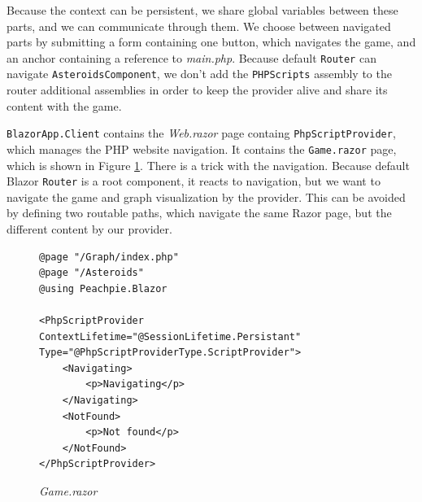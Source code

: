 Because the context can be persistent, we share global variables between these parts, and we can communicate through them.
We choose between navigated parts by submitting a form containing one button, which navigates the game, and an anchor containing a reference to \textit{main.php}.
Because default \texttt{Router} can navigate \texttt{AsteroidsComponent}, we don't add the \texttt{PHPScripts} assembly to the router additional assemblies in order to keep the provider alive and share its content with the game.
\par
\texttt{BlazorApp.Client} contains the \textit{Web.razor} page containg \texttt{PhpScriptProvider}, which manages the PHP website navigation.
It contains the \texttt{Game.razor} page, which is shown in Figure \ref{img29:razor}.
There is a trick with the navigation.
Because default Blazor \texttt{Router} is a root component, it reacts to navigation, but we want to navigate the game and graph visualization by the provider.
This can be avoided by defining two routable paths, which navigate the same Razor page, but the different content by our provider.
\par
\begin{figure}[!b]
\begin{lstlisting}
@page "/Graph/index.php"
@page "/Asteroids"
@using Peachpie.Blazor

<PhpScriptProvider ContextLifetime="@SessionLifetime.Persistant" 
Type="@PhpScriptProviderType.ScriptProvider">
    <Navigating>
        <p>Navigating</p>
    </Navigating>
    <NotFound>
        <p>Not found</p>
    </NotFound>
</PhpScriptProvider>
\end{lstlisting}
\caption{\textit{Game.razor}}
\label{img29:razor}
\end{figure}
